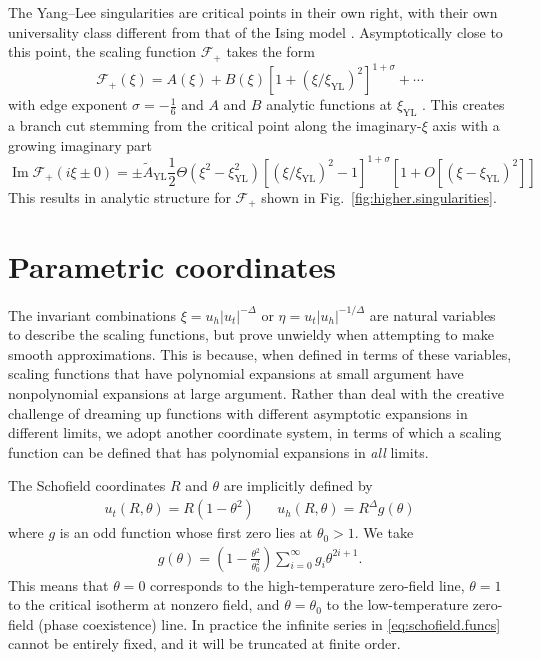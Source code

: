 \documentclass[
aps,
pre,
preprint,
longbibliography,
floatfix
]{revtex4-2}
\begin{document}
The Yang--Lee singularities are critical points in their own right, with their
own universality class different from that of the Ising model
\cite{Fisher_1978_Yang-Lee}. Asymptotically close to this point, the scaling
function $\mathcal F_+$ takes the form
\begin{equation} \label{eq:yang.lee.sing}
  \mathcal F_+(\xi)
  =A(\xi) +B(\xi)[1+(\xi/\xi_{\mathrm{YL}})^2]^{1+\sigma}+\cdots
\end{equation}
with edge exponent $\sigma=-\frac16$ and $A$ and $B$ analytic functions at
$\xi_\mathrm{YL}$ \cite{Cardy_1985_Conformal, Fonseca_2003_Ising}. This creates
a branch cut stemming from the critical point along the imaginary-$\xi$ axis
with a growing imaginary part
\begin{equation}
  \operatorname{Im}\mathcal F_+(i\xi\pm0)=\pm\tilde A_\mathrm{YL}\frac12\Theta(\xi^2-\xi_\mathrm{YL}^2)[(\xi/\xi_\mathrm{YL})^2-1]^{1+\sigma}[1+O[(\xi-\xi_\mathrm{YL})^2]]
\end{equation}
This results in analytic structure for $\mathcal F_+$ shown in
Fig.~\ref{fig:higher.singularities}.

\section{Parametric coordinates}

The invariant combinations $\xi=u_h|u_t|^{-\Delta}$ or
$\eta=u_t|u_h|^{-1/\Delta}$ are natural variables to describe the scaling
functions, but prove unwieldy when attempting to make smooth approximations.
This is because, when defined in terms of these variables, scaling functions
that have polynomial expansions at small argument have nonpolynomial expansions
at large argument. Rather than deal with the creative challenge of dreaming up
functions with different asymptotic expansions in different limits, we adopt
another coordinate system, in terms of which a scaling function can be defined
that has polynomial expansions in \emph{all} limits.

The Schofield coordinates $R$ and $\theta$ are implicitly defined by
\begin{align} \label{eq:schofield}
  u_t(R, \theta) = R(1-\theta^2)
  &&
  u_h(R, \theta) = R^{\Delta}g(\theta)
\end{align}
where $g$ is an odd function whose first zero lies at $\theta_0>1$. We take
\begin{align} \label{eq:schofield.funcs}
  g(\theta)=\left(1-\frac{\theta^2}{\theta_0^2}\right)\sum_{i=0}^\infty g_i\theta^{2i+1}.
\end{align}
This means that $\theta=0$ corresponds to the high-temperature zero-field line,
$\theta=1$ to the critical isotherm at nonzero field, and $\theta=\theta_0$ to
the low-temperature zero-field (phase coexistence) line.
In practice the infinite series in \eqref{eq:schofield.funcs} cannot be
entirely fixed, and it will be truncated at finite order.
\end{document}
